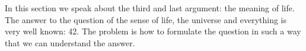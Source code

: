 In this section we speak about the third and last argument: the meaning of life. 
The answer \cite{Hitchhikers} to the question of the sense of life, the universe and everything is very well known: 42.
The problem is how to formulate the question in such a way that we can understand the answer.  
